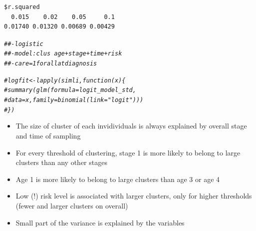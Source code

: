 \documentclass[]{revtex4}\usepackage[]{graphicx}\usepackage[]{color}
\makeatletter
\newcommand{\hlcom}[1]{\textcolor[rgb]{0.678,0.584,0.686}{\textit{#1}}}%
\newenvironment{kframe}{%
 \def\at@end@of@kframe{}%
 \ifinner\ifhmode%
  \def\at@end@of@kframe{\end{minipage}}%
  \begin{minipage}{\columnwidth}%
 \fi\fi%
 \def\FrameCommand##1{\hskip\@totalleftmargin \hskip-\fboxsep
 \colorbox{shadecolor}{##1}\hskip-\fboxsep
     \hskip-\linewidth \hskip-\@totalleftmargin \hskip\columnwidth}%
 \MakeFramed {\advance\hsize-\width
   \@totalleftmargin\z@ \linewidth\hsize
   \@setminipage}}%
 {\par\unskip\endMakeFramed%
 \at@end@of@kframe}
\newenvironment{knitrout}{}{} %
\makeatother
\begin{document}
\begin{knitrout}
\begin{kframe}
\begin{verbatim}
$r.squared
  0.015    0.02    0.05     0.1 
0.01740 0.01320 0.00689 0.00429 
\end{verbatim}
\begin{alltt}
\hlcom{##- logistic}
\hlcom{##- model: clus ~ age +  stage + time + risk}
\hlcom{##- care = 1 for all at diagnosis}

\hlcom{# logfit <- lapply(simli , function(x)\{}
\hlcom{#   summary(glm(formula = logit_model_std, }
\hlcom{#               data = x, family = binomial(link = "logit")))}
\hlcom{#   \}) }
\end{alltt}
\end{kframe}
\end{knitrout}
\begin{itemize}
\item The size of cluster of each invidividuals is always explained by overall stage and time of sampling
\item For every threshold of clustering, stage 1 is more likely to belong to large clusters than any other stages
\item Age 1 is more likely to belong to large clusters than age 3 or age 4
\item Low (!) risk level is associated with larger clusters, only for higher thresholds (fewer and larger clusters on overall)
\item Small part of the variance is explained by the variables
\end{itemize}
\end{document}
